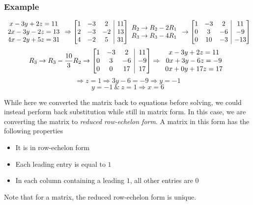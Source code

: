 \documentclass[12pt]{report}
\makeatletter
\newenvironment{amatrix}[1]{%
  \left[\begin{array}{@{}*{#1}{c}|c@{}}
}{%
  \end{array}\right]
}
\makeatother
\begin{document}
\begin{flushleft}
\subsubsection*{Example}


\[
    \begin{array}{c}
      x - 3y + 2z = 11 \\
      2x - 3y - 2z = 13 \\
      4x - 2y + 5z = 31 \\ 
    \end{array}
    \Rightarrow
    \begin{amatrix}{3}
      1 & -3 & 2 & 11 \\
      2 & -3 & -2 & 13 \\
      4 & -2 & 5 & 31 \\
    \end{amatrix}
    \begin{array}{c}
      R_2 \rightarrow R_2 - 2R_1 \\
      R_3 \rightarrow R_3 - 4R_1
    \end{array}
    \rightarrow
    \begin{amatrix}{3}
      1 & -3 & 2 & 11 \\
      0 & 3 & -6 & -9 \\
      0 & 10 & -3 & -13 \\
    \end{amatrix}
\]
\[
    R_3 \rightarrow R_3 - \frac{10}{3}R_2
    \rightarrow
    \begin{amatrix}{3}
      1 & -3 & 2 & 11 \\
      0 & 3 & -6 & -9 \\
      0 & 0 & 17 & 17 \\
    \end{amatrix}
    \Rightarrow
    \begin{array}{c}
      x -3y + 2z = 11 \\
      0x + 3y -6z = -9 \\
      0x + 0y + 17z = 17            
    \end{array}
\]
\[\Rightarrow z = 1 \Rightarrow 3y - 6 = -9 \Rightarrow y = -1\]
\[y = -1 \:\&\: z = 1 \Rightarrow x = 6\]

While here we converted the matrix back to equations before solving, we could
instead perform back substitution while still in matrix form. In this case, we
are converting the matrix to \textit{reduced row-echelon form}. A matrix in this
form has the following properties
\begin{itemize}
  \item It is in row-echelon form
  \item Each leading entry is equal to \(1\)
  \item In each column containing a leading \(1\), all other entries are \(0\)
\end{itemize}
Note that for a matrix, the reduced row-echelon form is unique.


\end{flushleft}
\end{document}
